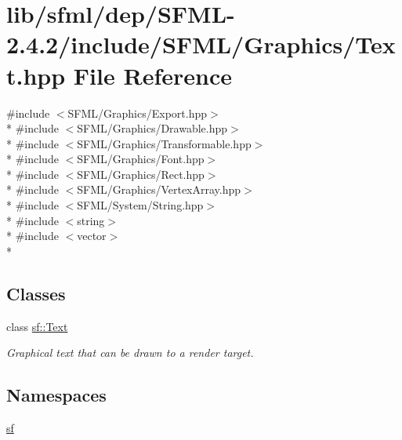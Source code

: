 \hypertarget{lib_2sfml_2dep_2_s_f_m_l-2_84_82_2include_2_s_f_m_l_2_graphics_2_text_8hpp}{\section{lib/sfml/dep/\-S\-F\-M\-L-\/2.4.2/include/\-S\-F\-M\-L/\-Graphics/\-Text.hpp File Reference}
\label{lib_2sfml_2dep_2_s_f_m_l-2_84_82_2include_2_s_f_m_l_2_graphics_2_text_8hpp}
}
{\ttfamily \#include $<$S\-F\-M\-L/\-Graphics/\-Export.\-hpp$>$}\\*
{\ttfamily \#include $<$S\-F\-M\-L/\-Graphics/\-Drawable.\-hpp$>$}\\*
{\ttfamily \#include $<$S\-F\-M\-L/\-Graphics/\-Transformable.\-hpp$>$}\\*
{\ttfamily \#include $<$S\-F\-M\-L/\-Graphics/\-Font.\-hpp$>$}\\*
{\ttfamily \#include $<$S\-F\-M\-L/\-Graphics/\-Rect.\-hpp$>$}\\*
{\ttfamily \#include $<$S\-F\-M\-L/\-Graphics/\-Vertex\-Array.\-hpp$>$}\\*
{\ttfamily \#include $<$S\-F\-M\-L/\-System/\-String.\-hpp$>$}\\*
{\ttfamily \#include $<$string$>$}\\*
{\ttfamily \#include $<$vector$>$}\\*
\subsection*{Classes}
\begin{DoxyCompactItemize}
\item 
class \hyperlink{classsf_1_1_text}{sf\-::\-Text}
\begin{DoxyCompactList}\small\item\em Graphical text that can be drawn to a render target. \end{DoxyCompactList}\end{DoxyCompactItemize}
\subsection*{Namespaces}
\begin{DoxyCompactItemize}
\item 
\hyperlink{namespacesf}{sf}
\end{DoxyCompactItemize}
